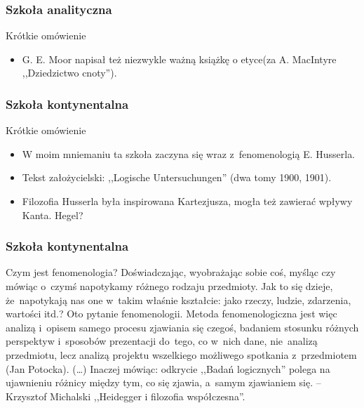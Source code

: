 \begin{frame}
\frametitle{Szkoła analityczna}
\begin{block}{Krótkie omówienie}
\begin{itemize}
\item G. E. Moor napisał też niezwykle ważną książkę o etyce\linebreak (za A. MacIntyre ,,Dziedzictwo cnoty'').
\end{itemize}
\end{block}
\end{frame}

\begin{frame}
\frametitle{Szkoła kontynentalna}
\begin{block}{Krótkie omówienie}
\begin{itemize}
\item W moim mniemaniu ta szkoła zaczyna się wraz z~fenomenologią E. Husserla.
\item Tekst założycielski: ,,Logische Untersuchungen'' (dwa tomy 1900, 1901).
\item Filozofia Husserla była inspirowana Kartezjusza, mogła też zawierać wpływy Kanta. Hegel?
\end{itemize}
\end{block}

\end{frame}

\begin{frame}
\frametitle{Szkoła kontynentalna}
\begin{block}{Czym jest fenomenologia?}
Doświadczając, wyobrażając sobie coś, myśląc czy mówiąc o~czymś napotykamy różnego rodzaju przedmioty. Jak to się dzieje, że~napotykają nas one w~takim właśnie kształcie: jako rzeczy, ludzie, zdarzenia, wartości itd.? Oto pytanie fenomenologii. Metoda fenomenologiczna jest więc analizą i~opisem samego procesu zjawiania się czegoś, badaniem stosunku różnych perspektyw i~sposobów prezentacji do~tego, co w~nich dane, nie~analizą przedmiotu, lecz analizą projektu wszelkiego możliwego spotkania z~przedmiotem (Jan Potocka). (\ldots) Inaczej mówiąc: odkrycie ,,Badań logicznych'' polega na ujawnieniu różnicy między tym, co się zjawia, a~samym zjawianiem się. -- Krzysztof Michalski ,,Heidegger i filozofia współczesna''.
\end{block}
\end{frame}

